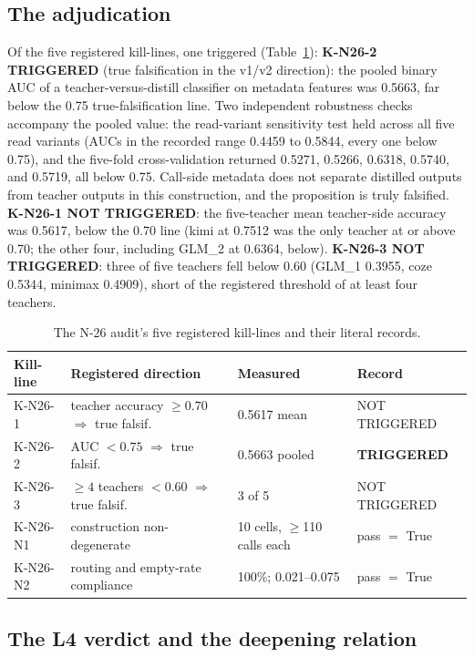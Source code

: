 \documentclass[11pt]{article}
\begin{document}
\subsection{The adjudication}

Of the five registered kill-lines, one triggered (Table~\ref{tab:n26}): \textbf{K-N26-2 TRIGGERED} (true falsification in the v1/v2 direction): the pooled binary AUC of a teacher-versus-distill classifier on metadata features was 0.5663, far below the 0.75 true-falsification line. Two independent robustness checks accompany the pooled value: the read-variant sensitivity test held across all five read variants (AUCs in the recorded range 0.4459 to 0.5844, every one below 0.75), and the five-fold cross-validation returned 0.5271, 0.5266, 0.6318, 0.5740, and 0.5719, all below 0.75. Call-side metadata does not separate distilled outputs from teacher outputs in this construction, and the proposition is truly falsified. \textbf{K-N26-1 NOT TRIGGERED}: the five-teacher mean teacher-side accuracy was 0.5617, below the 0.70 line (kimi at 0.7512 was the only teacher at or above 0.70; the other four, including GLM\_2 at 0.6364, below). \textbf{K-N26-3 NOT TRIGGERED}: three of five teachers fell below 0.60 (GLM\_1 0.3955, coze 0.5344, minimax 0.4909), short of the registered threshold of at least four teachers.

\begin{table}[htbp]
\centering
\begin{tabular}{llll}
\toprule
Kill-line & Registered direction & Measured & Record \\
\midrule
K-N26-1 & teacher accuracy $\geq 0.70$ $\Rightarrow$ true falsif. & 0.5617 mean & NOT TRIGGERED \\
K-N26-2 & AUC $< 0.75$ $\Rightarrow$ true falsif. & 0.5663 pooled & \textbf{TRIGGERED} \\
K-N26-3 & $\geq 4$ teachers $< 0.60$ $\Rightarrow$ true falsif. & 3 of 5 & NOT TRIGGERED \\
K-N26-N1 & construction non-degenerate & 10 cells, $\geq$110 calls each & pass $=$ True \\
K-N26-N2 & routing and empty-rate compliance & 100\%; 0.021--0.075 & pass $=$ True \\
\bottomrule
\end{tabular}
\caption{The N-26 audit's five registered kill-lines and their literal records.}
\label{tab:n26}
\end{table}

\subsection{The L4 verdict and the deepening relation}
\end{document}
